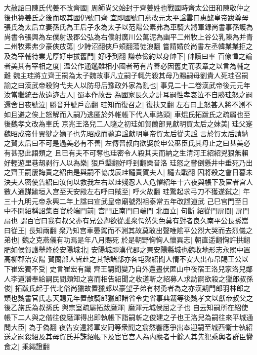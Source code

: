 大赦詔曰陳氏代姜不改齊國|{
	周師尚父始封于齊姜姓也戰國時齊太公田和陳敬仲之後也簒姜氏之後而取其國仍號曰齊}
宜即國號曰燕改元太平諡雲曰惠懿皇帝跋尊母張氏為太后立妻孫氏為王后子永為太子以范陽公素弗為車騎大將軍録尚書事孫護為尚書令張興為左僕射汲郡公弘為右僕射廣川公萬泥為幽平二州牧上谷公乳陳為并青二州牧素弗少豪俠放蕩|{
	少詩沼翻俠戶頰翻蕩徒浪翻}
嘗請婚於尚書左丞韓業業拒之及為宰輔待業尤厚好申拔舊門|{
	好呼到翻}
謙恭儉約以身帥下|{
	帥讀曰率}
百僚憚之論者美其有宰相之度|{
	温公作通鑑雖相小國者苟有片善必因舊史而表章之以言為輔之難}
魏主珪將立齊王嗣為太子魏故事凡立嗣子輒先殺其母乃賜嗣母劉貴人死珪召嗣諭之曰漢武帝殺鉤弋夫人以防母后豫政外家為亂也|{
	事見二十二卷漢武帝後元元年}
汝當繼統吾故遠迹古人|{
	蜀本作故吾}
為國家長久之計耳嗣性孝哀泣不自勝珪怒之嗣還舍日夜號泣|{
	勝音升號戶高翻}
珪知而復召之|{
	復扶又翻}
左右曰上怒甚入將不測不如且避之俟上怒解而入嗣乃逃匿於外帷帳下代人車路頭|{
	車焜氏拓跋氏之疏屬也至後魏孝文改為車氏}
京兆王洛兒二人隨之初珪如賀蘭部見獻明賀太后之妹美|{
	珪父寔魏昭成帝什翼犍之嫡子也先昭成而薨追諡獻明皇帝賀太后從夫諡}
言於賀太后請納之賀太后曰不可是過美必有不善|{
	左傳晉叔向欲娶於申公巫臣氏其母止之曰甚美必有甚惡此語類之}
且已有夫不可奪也珪密令人殺其夫而納之生清河王紹紹兇狠無賴好輕遊里巷刼剥行人以為樂|{
	狠戶墾翻好呼到翻樂音洛}
珪怒之嘗倒懸井中垂死乃出之齊王嗣屢誨責之紹由是與嗣不協戊辰珪譴責賀夫人|{
	譴去戰翻}
囚將殺之會日暮未決夫人密使告紹曰汝何以救我左右以珪殘忍人人危懼紹年十六夜與帳下及宦者宫人數人通謀踰垣入宫至天安殿左右呼曰賊至|{
	呼火故翻}
珪驚起求弓刀不獲遂弑之|{
	年三十九明元帝永興二年上諡曰宣武皇帝廟號烈祖泰常五年改諡道武}
己巳宫門至日中不開紹稱詔集百官於端門前|{
	宫門正南門曰端門}
北面立|{
	句斷}
紹從門扉間|{
	扉門扇也}
謂百官曰我有叔父亦有兄公卿欲從誰衆愕然失色莫有對者良久南平公長孫嵩曰從王|{
	長知兩翻}
衆乃知宫車晏駕而不測其故莫敢出聲唯隂平公烈大哭而去烈儀之弟也|{
	魏之克燕儀有功焉是年八月賜死}
於是朝野恟恟人懷異志|{
	朝直遥翻恟許拱翻}
肥如侯賀護舉烽於安陽城北|{
	安陽城即漢代郡之東安陽縣城也魏收地形志永熙中置高柳郡治安陽}
賀蘭部人皆赴之其餘諸部亦各屯聚紹聞人情不安大出布帛賜王公以下崔宏獨不受|{
	史言崔宏有識}
齊王嗣聞變乃自外還晝伏匿山中夜宿王洛兒家洛兒鄰人李道潛奉給嗣民間頗知之喜而相告紹聞之收道斬之紹募人求訪嗣欲殺之獵郎叔孫俊|{
	拓跋氏起于代北俗尚獵故置獵郎以豪望子弟有材勇者為之亦漢期門郎羽林郎之類也魏書官氏志天賜元年置散騎郎獵郎諸省令史省事典籖等後魏孝文以獻帝叔父之後乙旃氏為叔孫氏}
與宗室疏屬拓跋磨渾|{
	磨渾元城侯屈之子也}
自云知嗣所在紹使帳下二人與之偕往俊磨渾得出即執帳下詣嗣斬之俊建之子也王洛兒為嗣往來平城通問大臣|{
	為于偽翻}
夜告安遠將軍安同等衆聞之翕然響應爭出奉迎嗣至城西衛士執紹送之嗣殺紹及其母賀氏并誅紹帳下及宦官宫人為内應者十餘人其先犯乘輿者群臣臠食之|{
	乘繩證翻}
